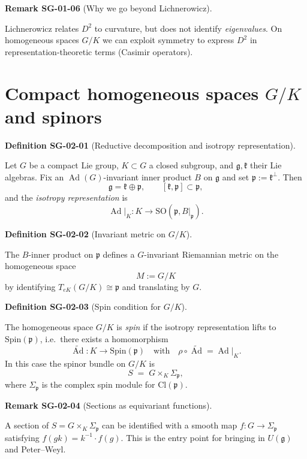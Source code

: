 \documentclass[10pt, letterpaper]{article}
\newcommand{\Ad}{\operatorname{Ad}}
\newcommand{\Cl}{\mathrm{Cl}}
\newcommand{\SO}{\mathrm{SO}}
\newcommand{\Spin}{\mathrm{Spin}}
\newcommand{\CustomHeading}[3]{%
  \par\medskip\noindent%
  \textbf{#1 #2} \textnormal{(#3)}.\enskip%
}
\newenvironment{DEF}[2]{\begin{unitbox}\CustomHeading{Definition}{#1}{#2}}{\end{unitbox}}
\newenvironment{REM}[2]{\begin{unitbox}\CustomHeading{Remark}{#1}{#2}}{\end{unitbox}}
\begin{document}
\begin{REM}{SG-01-06}{Why we go beyond Lichnerowicz}
Lichnerowicz relates $D^2$ to curvature, but does not identify \emph{eigenvalues}.
On homogeneous spaces $G/K$ we can exploit symmetry to express $D^2$ in representation-theoretic terms (Casimir operators).
\end{REM}

\section{Compact homogeneous spaces $G/K$ and spinors}

\begin{DEF}{SG-02-01}{Reductive decomposition and isotropy representation}
Let $G$ be a compact Lie group, $K\subset G$ a closed subgroup, and $\mathfrak g,\mathfrak k$ their Lie algebras.
Fix an $\Ad(G)$-invariant inner product $B$ on $\mathfrak g$ and set $\mathfrak p:=\mathfrak k^\perp$.
Then
\[
\mathfrak g=\mathfrak k\oplus \mathfrak p,\qquad [\mathfrak k,\mathfrak p]\subset \mathfrak p,
\]
and the \emph{isotropy representation} is
\[
\Ad|_K:K\to \SO(\mathfrak p,B|_{\mathfrak p}).
\]
\end{DEF}

\begin{DEF}{SG-02-02}{Invariant metric on $G/K$}
The $B$-inner product on $\mathfrak p$ defines a $G$-invariant Riemannian metric on the homogeneous space
\[
M:=G/K
\]
by identifying $T_{eK}(G/K)\cong \mathfrak p$ and translating by $G$.
\end{DEF}

\begin{DEF}{SG-02-03}{Spin condition for $G/K$}
The homogeneous space $G/K$ is \emph{spin} if the isotropy representation lifts to $\Spin(\mathfrak p)$, i.e.\ there exists a homomorphism
\[
\widetilde{\Ad}:K\to \Spin(\mathfrak p)
\quad\text{with}\quad
\rho\circ \widetilde{\Ad}=\Ad|_K.
\]
In this case the spinor bundle on $G/K$ is
\[
S \;=\; G\times_K \Sigma_{\mathfrak p},
\]
where $\Sigma_{\mathfrak p}$ is the complex spin module for $\Cl(\mathfrak p)$.
\end{DEF}

\begin{REM}{SG-02-04}{Sections as equivariant functions}
A section of $S=G\times_K \Sigma_{\mathfrak p}$ can be identified with a smooth map $f:G\to \Sigma_{\mathfrak p}$
satisfying $f(gk)=k^{-1}\cdot f(g)$. This is the entry point for bringing in $U(\mathfrak g)$ and Peter--Weyl.
\end{REM}
\end{document}
